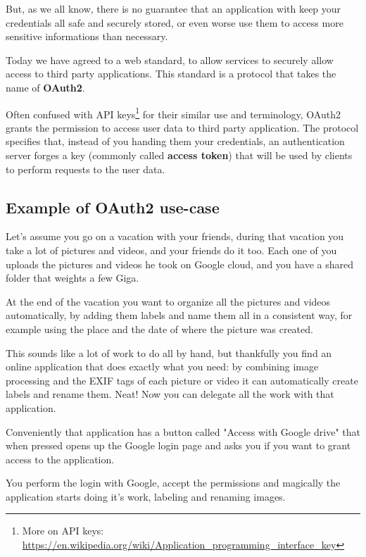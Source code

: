 \documentclass[11pt]{style}
\begin{document}
But, as we all know, there is no guarantee that an application with keep your
credentials all safe and securely stored, or even worse use them to access more
sensitive informations than necessary.

Today we have agreed to a web standard, to allow services to securely allow
access to third party applications.
This standard is a protocol that takes the name of \textbf{OAuth2}.

Often confused with API
keys\footnote{More on API keys:
\url{https://en.wikipedia.org/wiki/Application\_programming\_interface\_key}}
for their similar use and terminology, OAuth2 grants the permission to access
user data to third party application.
The protocol specifies that, instead of you handing them your credentials, an
authentication server forges a key (commonly called \textbf{access token}) that
will be used by clients to perform requests to the user data.

\subsection{Example of OAuth2 use-case}

Let's assume you go on a vacation with your friends, during that vacation you
take a lot of pictures and videos, and your friends do it too.
Each one of you uploads the pictures and videos he took on Google cloud, and
you have a shared folder that weights a few Giga.

At the end of the vacation you want to organize all the pictures and videos
automatically, by adding them labels and name them all in a consistent way, for
example using the place and the date of where the picture was created.

This sounds like a lot of work to do all by hand, but thankfully you find an
online application that does exactly what you need: by combining image
processing and the EXIF tags of each picture or video it can automatically
create labels and rename them. Neat! Now you can delegate all the work with that
application.

Conveniently that application has a button called "Access with Google drive"
that when pressed opens up the Google login page and asks you if you want to
grant access to the application.

You perform the login with Google, accept the permissions and magically the
application starts doing it's work, labeling and renaming images.

\end{document}
